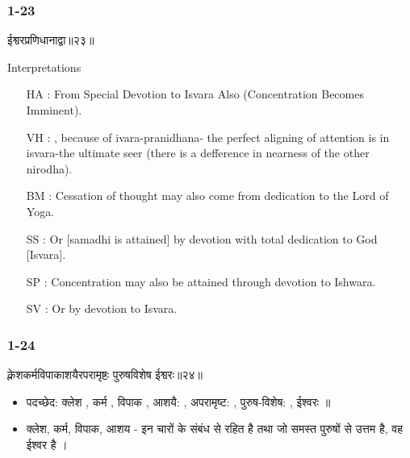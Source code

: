 \begin{frame}[fragile]\frametitle{1-23}
\begin{sanskrit}
ईश्वरप्रणिधानाद्वा॥२३॥
\end{sanskrit}

Interpretations
\begin{itemize}	
\item [HA]: From Special Devotion to Isvara Also (Concentration Becomes Imminent).
\item [VH]: , because of ivara-pranidhana- the perfect aligning of attention is in isvara-the ultimate seer (there is a defference in nearness of the other nirodha).
\item [BM]: Cessation of thought may also come from dedication to the Lord of Yoga.
\item [SS]: Or [samadhi is attained] by devotion with total dedication to God [Isvara].
\item [SP]: Concentration may also be attained through devotion to Ishwara.
\item [SV]: Or by devotion to Isvara. 
\end{itemize}
	
\end{frame}

\begin{frame}[fragile]\frametitle{1-24}
\begin{sanskrit}
क्लेशकर्मविपाकाशयैरपरामृष्टः पुरुषविशेष ईश्वरः॥२४॥
\end{sanskrit}

\begin{itemize}
\item पदच्छेद: क्लेश , कर्म , विपाक , आशयै: , अपरामृष्ट: , पुरुष-विशेष: , ईश्वरः ॥
\item क्लेश, कर्म, विपाक, आशय - इन चारों के संबंध से रहित है तथा जो समस्त पुरुषों से उत्तम है, वह ईश्वर है ।
\end{itemize}
	
\end{frame}

